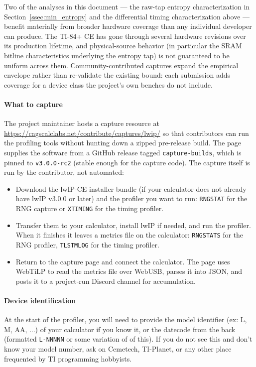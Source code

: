 \documentclass[titlepage]{report}
\begin{document}
	Two of the analyses in this document --- the raw-tap entropy characterization in Section~\ref{ssec:min_entropy} and the differential timing characterization above --- benefit materially from broader hardware coverage than any individual developer can produce. The TI-84+ CE has gone through several hardware revisions over its production lifetime, and physical-source behavior (in particular the SRAM bitline characteristics underlying the entropy tap) is not guaranteed to be uniform across them. Community-contributed captures expand the empirical envelope rather than re-validate the existing bound: each submission adds coverage for a device class the project's own benches do not include.

	\paragraph{What to capture}
	The project maintainer hosts a capture resource at \url{https://cagscalclabs.net/contribute/captures/lwip/} so that contributors can run the profiling tools without hunting down a zipped pre-release build. The page supplies the software from a GitHub release tagged \texttt{capture-builds}, which is pinned to \texttt{v3.0.0-rc2} (stable enough for the capture code). The capture itself is run by the contributor, not automated:

	\begin{itemize}
		\item Download the lwIP-CE installer bundle (if your calculator does not already have lwIP v3.0.0 or later) and the profiler you want to run: \texttt{RNGSTAT} for the RNG capture or \texttt{XTIMING} for the timing profiler.
		\item Transfer them to your calculator, install lwIP if needed, and run the profiler. When it finishes it leaves a metrics file on the calculator: \texttt{RNGSTATS} for the RNG profiler, \texttt{TLSTMLOG} for the timing profiler.
		\item Return to the capture page and connect the calculator. The page uses WebTiLP to read the metrics file over WebUSB, parses it into JSON, and posts it to a project-run Discord channel for accumulation.
	\end{itemize}

	\paragraph{Device identification}\label{par:device_id}
	At the start of the profiler, you will need to provide the model identifier (ex: L, M, AA, ...) of your calculator if you know it, or the datecode from the back (formatted \texttt{L-NNNNN} or some variation of of this). If you do not see this and don't know your model number, ask on Cemetech, TI-Planet, or any other place frequented by TI programming hobbyists.
\end{document}
